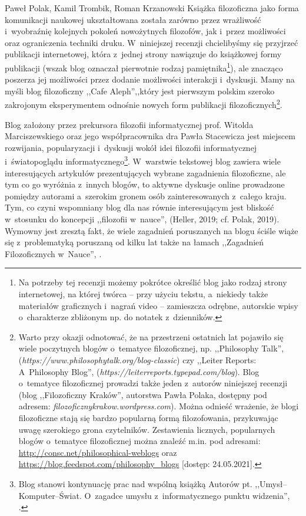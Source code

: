 \begin{newrevplenv}{Paweł Polak, Kamil Trombik, Roman Krzanowski}
Książka filozoficzna jako forma komunikacji naukowej ukształtowana została zarówno przez wrażliwość i~wyobraźnię kolejnych pokoleń nowożytnych filozofów, jak i~przez możliwości oraz ograniczenia techniki druku. W~niniejszej recenzji chcielibyśmy się przyjrzeć publikacji internetowej, która z~jednej strony nawiązuje do książkowej formy publikacji (wszak blog oznaczał pierwotnie rodzaj pamiętnika\footnote{Na potrzeby tej recenzji możemy pokrótce określić blog jako rodzaj strony internetowej, na której twórca -- przy użyciu tekstu, a~niekiedy także materiałów graficznych i~nagrań video -- zamieszcza odrębne, autorskie wpisy o~charakterze zbliżonym np. do notatek z~dzienników.}), ale znacząco poszerza jej możliwości przez dodanie możliwości interakcji i~dyskusji. Mamy na myśli blog filozoficzny ,,Cafe Aleph'',,który jest pierwszym polskim szeroko zakrojonym eksperymentem odnośnie nowych form publikacji filozoficznych\footnote{Warto przy okazji odnotować, że na przestrzeni ostatnich lat pojawiło się wiele poczytnych blogów o~tematyce filozoficznej, np. ,,Philosophy Talk'', (\textit{https://www.philosophytalk.org/blog-classic}) czy ,,Leiter Reports: A~Philosophy Blog'', (\textit{https://leiterreports.typepad.com/blog}). Blog o~tematyce filozoficznej prowadzi także jeden z~autorów niniejszej recenzji (blog ,,Filozoficzny Kraków'', autorstwa Pawła Polaka, dostępny pod adresem: \textit{filozoficznykrakow.wordpress.com}). Można odnieść wrażenie, że blogi filozoficzne stają się bardzo popularną formą filozofowania, przykuwając uwagę szerokiego grona czytelników. Zestawienia licznych, popularnych blogów o~tematyce filozoficznej można znaleźć m.in. pod adresami: \url{http://consc.net/philosophical-weblogs} oraz \url{https://blog.feedspot.com/philosophy_blogs} [dostęp: 24.05.2021].}.

Blog założony przez prekursora filozofii informatycznej prof. Witolda Marciszewskiego oraz jego współpracownika dra Pawła Stacewicza jest miejscem rozwijania, popularyzacji i~dyskusji wokół idei filozofii informatycznej i~światopoglądu informatycznego\footnote{Blog stanowi kontynuację prac nad wspólną książką Autorów pt. ,,Umysł–Komputer–Świat. O~zagadce umysłu z~informatycznego punktu widzenia'',
\parencite{marciszewski_2011}.%
}. W~warstwie tekstowej blog zawiera wiele interesujących artykułów prezentujących wybrane zagadnienia filozoficzne, ale tym co go wyróżnia z~innych blogów, to aktywne dyskusje online prowadzone pomiędzy autorami a~szerokim gronem osób zainteresowanych z~całego kraju. Tym, co czyni wspomniany blog dla nas równie interesującym jest bliskość w~stosunku do koncepcji ,,filozofii w~nauce'',
(Heller, 2019; cf. Polak, 2019).
\parencites[][]{heller_how_2019}[cf.][]{polak_philosophy_2019}
Wymowny jest zresztą fakt, że wiele zagadnień poruszanych na blogu ściśle wiąże się z~problematyką poruszaną od kilku lat także na łamach ,,Zagadnień Filozoficznych w~Nauce'',
\parencites{leciejewski_structure_2018}{krzanowski_why_2020}{krzanowski_minimal_2017}{krzanowski_towards_2016}{kycia_information_2020}{kycia_information_2021}.


\end{newrevplenv}
